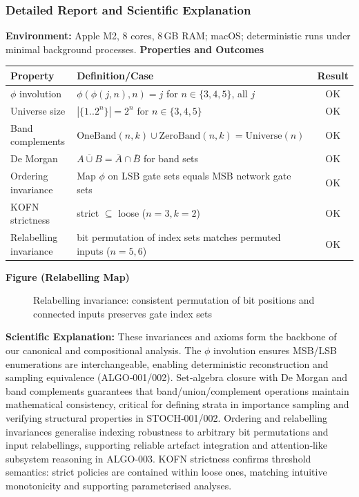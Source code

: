 \subsubsection{Detailed Report and Scientific Explanation}
\textbf{Environment:} Apple M2, 8 cores, 8\,GB RAM; macOS; deterministic runs under minimal background processes.
\textbf{Properties and Outcomes}
\begin{center}
\begin{tabular}{llc}
\toprule
Property & Definition/Case & Result \\
\midrule
$\phi$ involution & $\phi(\phi(j,n),n)=j$ for $n\in\{3,4,5\}$, all $j$ & OK \\
Universe size & $|\{1..2^n\}|=2^n$ for $n\in\{3,4,5\}$ & OK \\
Band complements & $\mathrm{OneBand}(n,k)\cup\mathrm{ZeroBand}(n,k)=\mathrm{Universe}(n)$ & OK \\
De Morgan & $\overline{A\cup B}=\overline{A}\cap\overline{B}$ for band sets & OK \\
Ordering invariance & Map $\phi$ on LSB gate sets equals MSB network gate sets & OK \\
KOFN strictness & strict $\subseteq$ loose ($n=3, k=2$) & OK \\
Relabelling invariance & bit permutation of index sets matches permuted inputs ($n=5,6$) & OK \\
\bottomrule
\end{tabular}
\end{center}
\textbf{Figure (Relabelling Map)}
\begin{figure}[h]
\centering
{}
\caption{Relabelling invariance: consistent permutation of bit positions and connected inputs preserves gate index sets}
\end{figure}
\textbf{Scientific Explanation:} These invariances and axioms form the backbone of our canonical and compositional analysis. The $\phi$ involution ensures MSB/LSB enumerations are interchangeable, enabling deterministic reconstruction and sampling equivalence (ALGO‑001/002). Set‑algebra closure with De Morgan and band complements guarantees that band/union/complement operations maintain mathematical consistency, critical for defining strata in importance sampling and verifying structural properties in STOCH‑001/002. Ordering and relabelling invariances generalise indexing robustness to arbitrary bit permutations and input relabellings, supporting reliable artefact integration and attention‑like subsystem reasoning in ALGO‑003. KOFN strictness confirms threshold semantics: strict policies are contained within loose ones, matching intuitive monotonicity and supporting parameterised analyses.

